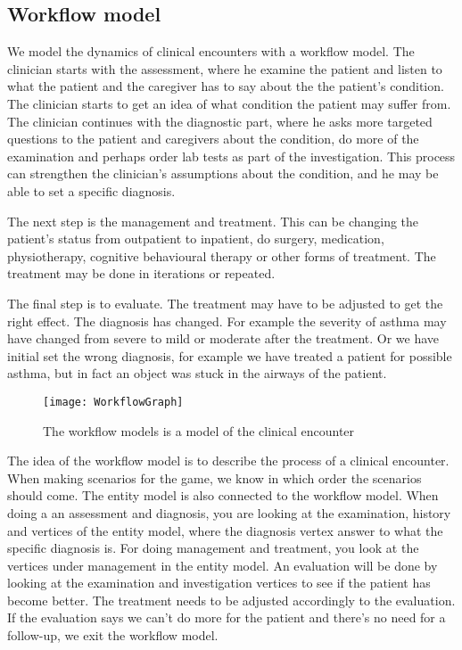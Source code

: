 \subsection{Workflow model}
We model the dynamics of clinical encounters with a workflow model. The clinician starts with the assessment, where he examine the patient and listen to what the patient and the caregiver has to say about the the patient's condition. The clinician starts to get an idea of what condition the patient may suffer from. The clinician continues with the diagnostic part, where he asks more targeted questions to the patient and caregivers about the condition, do more of the examination and perhaps order lab tests as part of the investigation. This process can strengthen the clinician's assumptions about the condition, and he may be able to set a specific diagnosis.

The next step is the management and treatment. This can be changing the patient's status from outpatient to inpatient, do surgery, medication, physiotherapy, cognitive behavioural therapy or other forms of treatment. The treatment may be done in iterations or repeated.


The final step is to evaluate. The treatment may have to be adjusted to get the right effect. The diagnosis has changed. For example the severity of asthma may have changed from severe to mild or moderate after the treatment. Or we have initial set the wrong diagnosis, for example we have treated a patient for possible asthma, but in fact an object was stuck in the airways of the patient.


\begin{figure}[h!]
	\label{fig:WorkflowGraph}
	\texttt{[image: WorkflowGraph]}
	\caption {The workflow models is a model of the clinical encounter}
\end{figure}

The idea of the workflow model is to describe the process of a clinical encounter. When making scenarios for the game, we know in which order the scenarios should come. The entity model is also connected to the workflow model. When doing a an assessment and diagnosis, you are looking at the examination, history and vertices of the entity model, where the diagnosis vertex answer to what the specific diagnosis is. For doing management and treatment, you look at the vertices under management in the entity model. An evaluation will be done by looking at the examination and investigation vertices to see if the patient has become better. The treatment needs to be adjusted accordingly to the evaluation. If the evaluation says we can't do more for the patient and there's no need for a follow-up, we exit the workflow model.

